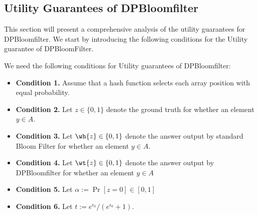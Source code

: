 \subsection{Utility Guarantees of DPBloomfilter}\label{sec:tec_utility_dp}
This section will present a comprehensive analysis of the utility guarantees for DPBloomfilter.
We start by introducing the following conditions for the Utility guarantee of DPBloomFilter.
\begin{condition} \label{con:utility_condition}
We need the following conditions for Utility guarantees of DPBloomfilter:
\begin{itemize}
    \item \textbf{Condition 1.} Assume that a hash function selects each array position with equal probability.
    \item \textbf{Condition 2.} Let $z \in \{0,1\}$ denote the ground truth for whether an element $y \in A$.
    \item \textbf{Condition 3.} Let $\wh{z} \in \{0,1\}$ denote the answer output by standard Bloom Filter for whether an element $y \in A$.
    \item \textbf{Condition 4.} Let $\wt{z} \in \{0,1\}$ denote the answer output by DPBloomfilter for whether an element $y \in A$
    \item \textbf{Condition 5.} Let $\alpha:=\Pr[z=0] \in [0,1]$
    \item \textbf{Condition 6.} Let $t := e^{\epsilon_0} / (e^{\epsilon_0} + 1)$. 
\end{itemize}
    
\end{condition}

